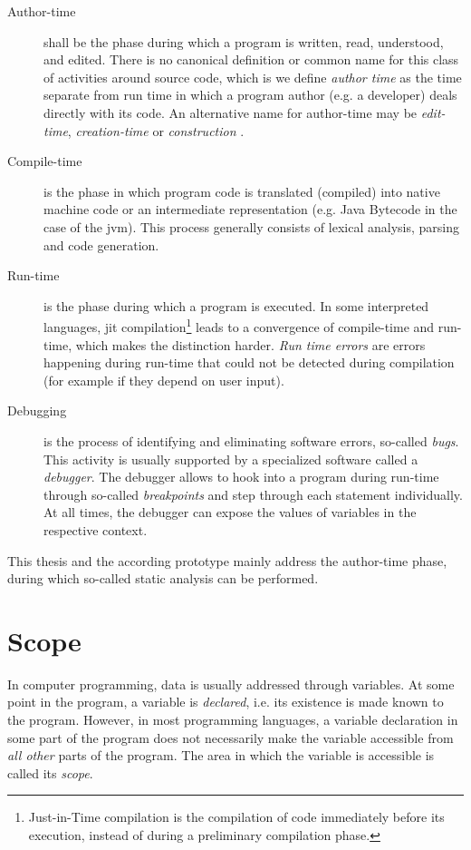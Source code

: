 \begin{description}
\item[Author-time]
shall be the phase during which a program is written, read, understood,
and edited. There is no canonical definition or common name for this
class of activities around source code, which is we define \emph{author
time} as the time separate from run time in which a program author (e.g.
a developer) deals directly with its code. An alternative name for
author-time may be \emph{edit-time}, \emph{creation-time} \cite{getify}
or \emph{construction} \cite{mcconnell}.
\item[Compile-time]
is the phase in which program code is translated (compiled) into native
machine code or an intermediate representation (e.g. Java Bytecode in
the case of the \ac{jvm}). This process generally consists of lexical
analysis, parsing and code generation.
\item[Run-time]
is the phase during which a program is executed. In some interpreted
languages, \ac{jit} compilation\footnote{Just-in-Time compilation is the
  compilation of code immediately before its execution, instead of
  during a preliminary compilation phase.} leads to a convergence of
compile-time and run-time, which makes the distinction harder. \emph{Run
time errors} are errors happening during run-time that could not be
detected during compilation (for example if they depend on user input).
\item[Debugging]
is the process of identifying and eliminating software errors, so-called
\emph{bugs}. This activity is usually supported by a specialized
software called a \emph{debugger}. The debugger allows to hook into a
program during run-time through so-called \emph{breakpoints} and step
through each statement individually. At all times, the debugger can
expose the values of variables in the respective context.
\end{description}

This thesis and the according prototype mainly address the author-time
phase, during which so-called static analysis can be performed.

\section{Scope}\label{scope}

In computer programming, data is usually addressed through variables. At
some point in the program, a variable is \emph{declared}, i.e. its
existence is made known to the program. However, in most programming
languages, a variable declaration in some part of the program does not
necessarily make the variable accessible from \emph{all other} parts of
the program. The area in which the variable is accessible is called its
\emph{scope}.

